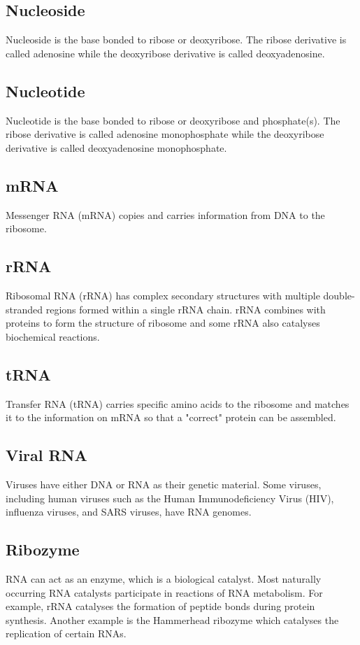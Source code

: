 \documentclass[11pt]{article}
\begin{document}
\subsection{Nucleoside}
\label{sec:org2355a4a}
Nucleoside is the base bonded to ribose or deoxyribose. The ribose derivative is called adenosine while the deoxyribose derivative is called deoxyadenosine.

\subsection{Nucleotide}
\label{sec:org60437b3}
Nucleotide is the base bonded to ribose or deoxyribose and phosphate(s). The ribose derivative is called adenosine monophosphate while the deoxyribose derivative is called deoxyadenosine monophosphate.

\subsection{mRNA}
\label{sec:orgd6f32d8}
Messenger RNA (mRNA) copies and carries information from DNA to the ribosome.

\subsection{rRNA}
\label{sec:org4dfa98c}
Ribosomal RNA (rRNA) has complex secondary structures with multiple double-stranded regions formed within a single rRNA chain. rRNA combines with proteins to form the structure of ribosome and some rRNA also catalyses biochemical reactions.

\subsection{tRNA}
\label{sec:orgd10cc9c}
Transfer RNA (tRNA) carries specific amino acids to the ribosome and matches it to the information on mRNA so that a "correct" protein can be assembled.

\subsection{Viral RNA}
\label{sec:org184239f}
Viruses have either DNA or RNA as their genetic material. Some viruses, including human viruses such as the Human Immunodeficiency Virus (HIV), influenza viruses, and SARS viruses, have RNA genomes.

\subsection{Ribozyme}
\label{sec:org2d8ece3}
RNA can act as an enzyme, which is a biological catalyst. Most naturally occurring RNA catalysts participate in reactions of RNA metabolism. For example, rRNA catalyses the formation of peptide bonds during protein synthesis. Another example is the Hammerhead ribozyme which catalyses the replication of certain RNAs.
\end{document}
